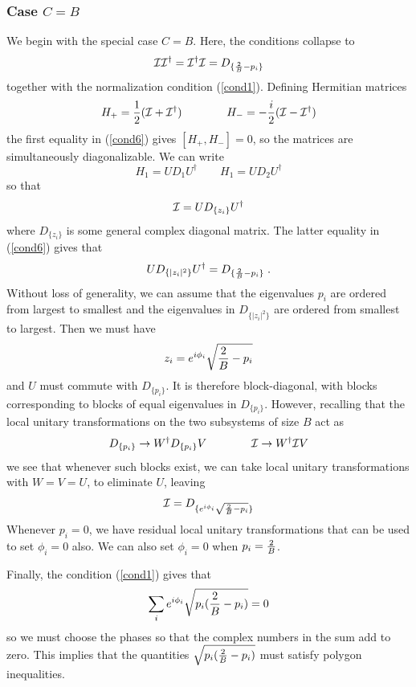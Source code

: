 \documentclass[12pt]{article}
\theoremstyle{definition}
\newcommand{\be}{\begin{equation}}
\newcommand{\ee}{\end{equation}}
\begin{document}
\subsubsection*{Case $C=B$}

We begin with the special case $C=B$. Here, the conditions collapse to
\be
\label{cond6}
{\cal I} {\cal I}^\dagger = {\cal I}^\dagger {\cal I} = D_{\{{2 \over B} - p_i\}}
\ee
together with the normalization condition (\ref{cond1}). Defining Hermitian matrices
\be
H_+ = {1 \over 2} ({\cal I} + {\cal I}^\dagger) \qquad \qquad H_- = -{i \over 2} ({\cal I} - {\cal I}^\dagger)
\ee
the first equality in (\ref{cond6}) gives $[H_+,H_-] = 0$, so the matrices are simultaneously diagonalizable. We can write
\be
H_1 = U D_1 U^\dagger \qquad H_1 = U D_2 U^\dagger
\ee
so that
\be
{\cal I} = U D_{\{z_i\}} U^\dagger
\ee
where $D_{\{z_i\}}$ is some general complex diagonal matrix. The latter equality in (\ref{cond6}) gives that
\be
U D_{\{|z_i|^2\}} U^\dagger = D_{\{{2 \over B} - p_i\}} \; .
\ee
Without loss of generality, we can assume that the eigenvalues $p_i$ are ordered from largest to smallest and the eigenvalues in $D_{\{|z_i|^2\}}$ are ordered from smallest to largest. Then we must have
\be
z_i = e^{i \phi_i} \sqrt{{2 \over B} - p_i}
\ee
and $U$ must commute with $D_{\{p_i\}}$. It is therefore block-diagonal, with blocks corresponding to blocks of equal eigenvalues in $D_{\{p_i\}}$. However, recalling that the local unitary transformations on the two subsystems of size $B$ act as
\be
D_{\{p_i\}} \to W^\dagger D_{\{p_i\}} V \qquad \qquad {\cal I} \to W^\dagger {\cal I} V
\ee
we see that whenever such blocks exist, we can take local unitary transformations with $W = V = U$, to eliminate $U$, leaving
\be
{\cal I} = D_{\{e^{i \phi_i} \sqrt{{2 \over B} - p_i}  \}}
\ee
Whenever $p_i=0$, we have residual local unitary transformations that can be used to set $\phi_i=0$ also. We can also set $\phi_i = 0$ when $p_i = {2 \over B}$.

Finally, the condition (\ref{cond1}) gives that
\be
\label{polygon}
\sum_i e^{i \phi_i} \sqrt{p_i({2 \over B} - p_i)}  = 0
\ee
so we must choose the phases so that the complex numbers in the sum add to zero. This implies that the quantities $\sqrt{p_i({2 \over B} - p_i)}$ must satisfy polygon inequalities.
\end{document}
